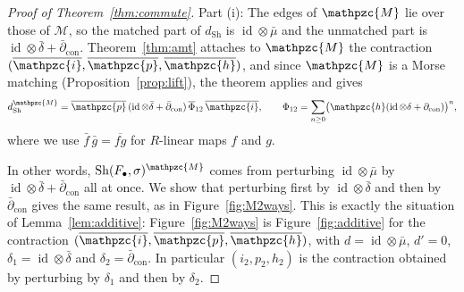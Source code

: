 \documentclass[12pt]{amsart}
\theoremstyle{plain}
\theoremstyle{definition}
\newcommand{\dcon}{\partial_{\mathrm{con}}}
\newcommand{\F}{ {F_\bullet} }
\newcommand{\M}{\mathcal{M}}
\newcommand{\lift}[1]{\mathpzc{#1}}
\newcommand{\id}{\operatorname{id}}
\newcommand{\Sh}{\mathrm{Sh}}
\begin{document}
\begin{proof}[Proof of Theorem~\ref{thm:commute}]
    Part (i): The edges of $\lift{M}$ lie over those of $\M$, so the matched part of $d_{\Sh}$ is $\id \otimes \bar\mu$ and the unmatched part is $\id \otimes \bar\delta + \bar\partial_{\mathrm{con}}$. Theorem~\ref{thm:amt} attaches to $\lift{M}$ the contraction $(\overline{\lift{i}}, \overline{\lift{p}}, \overline{\lift{h}})$, and since $\lift{M}$ is a Morse matching (Proposition~\ref{prop:lift}), the theorem applies and gives
    \[
        d_{\Sh}^{\lift{M}} = \overline{\lift{p}} \, (\id \otimes \bar\delta + \bar\partial_{\mathrm{con}}) \, \overline{\Phi}_{12} \, \overline{\lift{i}}, \qquad \Phi_{12} = \sum_{n \ge 0} \bigl( \lift{h} (\id \otimes \delta + \dcon) \bigr)^n ,
    \]
    where we use $\bar f \, \bar g = \overline{fg}$ for $R$-linear maps $f$ and $g$.

    In other words, $\Sh(\F, \sigma)^{\lift{M}}$ comes from perturbing $\id \otimes \bar\mu$ by $\id \otimes \bar\delta + \bar\partial_{\mathrm{con}}$ all at once. We show that perturbing first by $\id \otimes \bar\delta$ and then by $\bar\partial_{\mathrm{con}}$ gives the same result, as in Figure~\ref{fig:M2ways}. This is exactly the situation of Lemma~\ref{lem:additive}: Figure~\ref{fig:M2ways} is Figure~\ref{fig:additive} for the contraction $(\overline{\lift{i}}, \overline{\lift{p}}, \overline{\lift{h}})$, with $d = \id \otimes \bar\mu$, $d' = 0$, $\delta_1 = \id \otimes \bar\delta$ and $\delta_2 = \bar\partial_{\mathrm{con}}$. In particular $(i_2, p_2, h_2)$ is the contraction obtained by perturbing by $\delta_1$ and then by $\delta_2$.


\end{proof}
\end{document}
